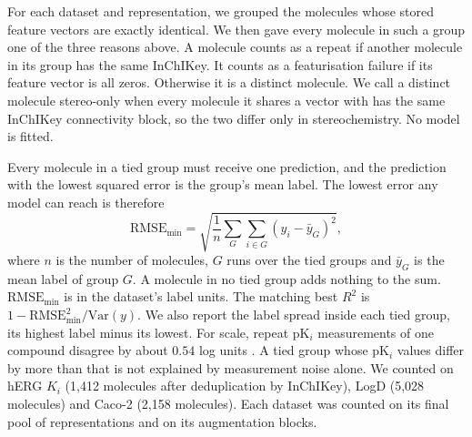 For each dataset and representation, we grouped the molecules whose stored feature vectors are exactly identical. We then gave every molecule in such a group one of the three reasons above. A molecule counts as a repeat if another molecule in its group has the same InChIKey. It counts as a featurisation failure if its feature vector is all zeros. Otherwise it is a distinct molecule. We call a distinct molecule stereo-only when every molecule it shares a vector with has the same InChIKey connectivity block, so the two differ only in stereochemistry. No model is fitted.

Every molecule in a tied group must receive one prediction, and the prediction with the lowest squared error is the group's mean label. The lowest error any model can reach is therefore
\begin{equation}
\mathrm{RMSE}_{\min} = \sqrt{\frac{1}{n}\sum_{G}\sum_{i \in G}\left(y_i - \bar{y}_G\right)^2},
\end{equation}
where $n$ is the number of molecules, $G$ runs over the tied groups and $\bar{y}_G$ is the mean label of group $G$. A molecule in no tied group adds nothing to the sum. $\mathrm{RMSE}_{\min}$ is in the dataset's label units. The matching best $R^2$ is $1 - \mathrm{RMSE}_{\min}^2 / \mathrm{Var}(y)$. We also report the label spread inside each tied group, its highest label minus its lowest. For scale, repeat pK$_i$ measurements of one compound disagree by about $0.54$ log units \citep{Kramer2012}. A tied group whose pK$_i$ values differ by more than that is not explained by measurement noise alone. We counted on hERG $K_i$ (1,412 molecules after deduplication by InChIKey), LogD (5,028 molecules) and Caco-2 (2,158 molecules). Each dataset was counted on its final pool of representations and on its augmentation blocks.

